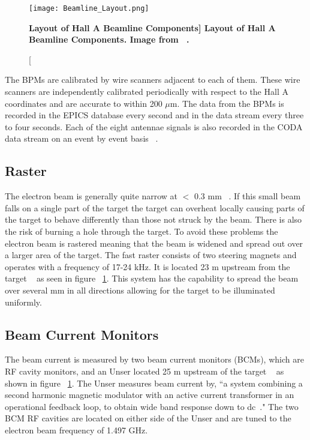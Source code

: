\begin{figure}[!ht]
\begin{center}
\texttt{[image: Beamline\_Layout.png]}
\end{center}
\caption[\bf{Layout of Hall A Beamline Components}]{
{\bf{Layout of Hall A Beamline Components.}} Image from ~\cite{Thesis:Wang}.}
\label{fig:beamline}
\end{figure}

The BPMs are calibrated by wire scanners adjacent to each of them. These wire scanners are independently calibrated periodically with respect to the Hall A coordinates and are accurate to within 200 $\mu$m. The data from the BPMs is recorded in the EPICS database every second and in the data stream every three to four seconds. Each of the eight antennae signals is also recorded in the CODA data stream on an event by event basis ~\cite{Thesis:Ye}. 

\subsection{Raster}
\label{ssec:raster}

The electron beam is generally quite narrow at $<$ 0.3 mm ~\cite{Thesis:Wang}. If this small beam falls on a single part of the target the target can overheat locally causing parts of the target to behave differently than those not struck by the beam. There is also the risk of burning a hole through the target. To avoid these problems the electron beam is rastered meaning that the beam is widened and spread out over a larger area of the target. The fast raster consists of two steering magnets and operates with a frequency of 17-24 kHz. It is located 23 m upstream from the target ~\cite{Article:HallA} as seen in figure ~\ref{fig:beamline}. This system has the capability to spread the beam over several mm in all directions allowing for the target to be illuminated uniformly. 

\subsection{Beam Current Monitors}
\label{ssec:bcms}

The beam current is measured by two beam current monitors (BCMs), which are RF cavity monitors, and an Unser located 25 m upstream of the target ~\cite{Article:HallA} as shown in figure ~\ref{fig:beamline}. The Unser measures beam current by, ``a system combining a second harmonic magnetic modulator with an active current transformer in an operational feedback loop, to obtain wide band response down to dc~\cite{Article:Unser}." The two BCM RF cavities are located on either side of the Unser and are tuned to the electron beam frequency of 1.497 GHz. 

